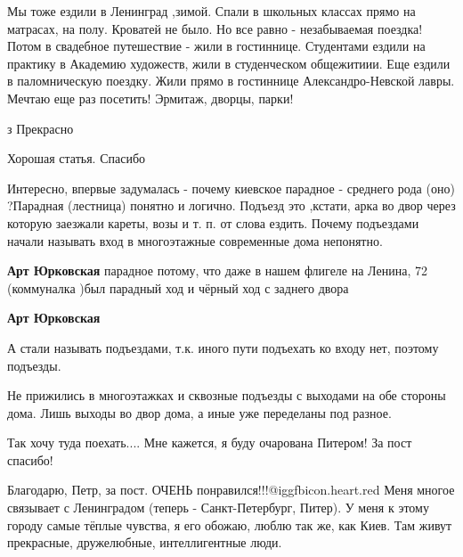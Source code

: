 \begin{itemize}

Мы тоже ездили в Ленинград ,зимой. Спали в школьных классах прямо на матрасах, на
полу. Кроватей не было. Но все равно - незабываемая поездка! Потом в свадебное
путешествие - жили в гостиннице. Студентами ездили на практику в Академию
художеств, жили в студенческом общежитиии. Еще ездили в паломническую
поездку. Жили прямо в гостиннице Александро-Невской лавры. Мечтаю еще раз
посетить! Эрмитаж, дворцы, парки!

з Прекрасно

Хорошая статья. Спасибо


Интересно, впервые задумалась - почему киевское парадное - среднего рода (оно)
?Парадная (лестница) понятно и логично. Подъезд это ,кстати, арка во двор через
которую заезжали кареты, возы и т. п. от слова ездить. Почему подъездами начали
называть вход в многоэтажные современные дома непонятно.

\begin{itemize} %
\textbf{Арт Юрковская} парадное потому, что даже в нашем флигеле на Ленина, 72 (коммуналка )был парадный ход и чёрный ход с заднего двора

\textbf{Арт Юрковская}

А стали называть подъездами, т.к. иного пути подъехать ко входу нет, поэтому подъезды.

Не прижились в многоэтажках и сквозные подъезды с выходами на обе стороны дома.
Лишь выходы во двор дома, а иные уже переделаны под разное.

\end{itemize} %


Так хочу туда поехать.... Мне кажется, я буду очарована Питером! За пост
спасибо!


Благодарю, Петр, за пост. ОЧЕНЬ понравился!!!@igg{fbicon.heart.red} Меня многое
связывает с Ленинградом (теперь - Санкт-Петербург, Питер). У меня к этому
городу самые тёплые чувства, я его обожаю, люблю так же, как Киев. Там живут
прекрасные, дружелюбные, интеллигентные люди. 


\end{itemize}
